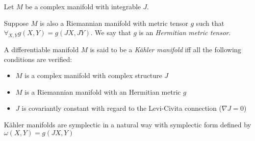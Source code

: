 \documentclass[12pt]{article}
\begin{document}
Let $M$ be a  complex manifold with integrable   $J$.

Suppose $M$ is also a Riemannian manifold with metric tensor $g$ such that $\forall_{X,Y} g(X,Y) = g(JX,JY)$. We say that $g$ is an \emph{Hermitian metric tensor}.

A differentiable manifold $M$ is said to be a \emph{K\"ahler manifold} iff all the following conditions are verified:
\begin{itemize}
\item $M$ is a complex manifold with  complex structure $J$
\item $M$ is a Riemannian manifold with an Hermitian metric $g$
\item $J$ is covariantly constant with regard to the Levi-Civita connection ($\nabla J = 0$)
\end{itemize}

K\"ahler manifolds are symplectic in a natural way with symplectic form defined by $\omega(X,Y) = g(JX,Y)$
\end{document}

